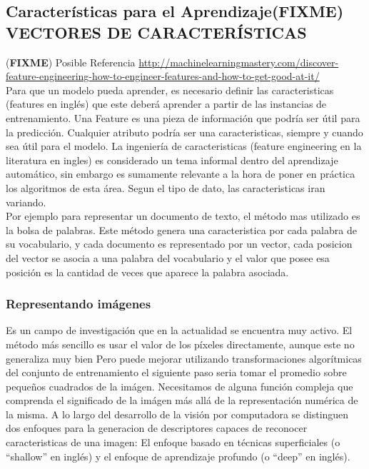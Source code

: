 \documentclass[a4paper,11pt,spanish]{book}
\newcommand*{\FIXME}[1]{{(\textbf{FIXME}) {#1}}}
\begin{document}
    \subsection{Características para el Aprendizaje\FIXME{VECTORES DE CARACTERÍSTICAS}}
      \FIXME{Posible Referencia \url{http://machinelearningmastery.com/discover-feature-engineering-how-to-engineer-features-and-how-to-get-good-at-it/}}\\
      Para que un modelo pueda aprender, es necesario definir las caracteristicas (features en inglés) que este deberá aprender a partir de las instancias de entrenamiento.
      Una Feature es una pieza de información que podría ser útil para la predicción. Cualquier atributo podría ser una caracteristicas, siempre y cuando sea útil para el modelo.
      La ingeniería de caracteristicas (feature engineering en la literatura en ingles) es considerado un tema informal dentro del aprendizaje automático, sin embargo es sumamente
      relevante a la hora de poner en práctica los algoritmos de esta área.
      Segun el tipo de dato, las caracteristicas iran variando. \\
      Por ejemplo para representar un documento de texto, el método mas utilizado es la bolsa de palabras.
      Este método genera una caracteristica por cada palabra de su vocabulario, y cada documento es representado por un vector, cada posicion del vector se asocia a una palabra del
      vocabulario y el valor que posee esa posición es la cantidad de veces que aparece la palabra asociada.

      \subsubsection{Representando imágenes}
	Es un campo de investigación que en la actualidad se encuentra muy activo. El método más sencillo es usar el valor de los píxeles directamente, aunque este no generaliza muy bien
	Pero puede mejorar utilizando transformaciones algorítmicas del conjunto de entrenamiento el siguiente paso seria tomar el promedio sobre pequeños cuadrados de la imágen.
	Necesitamos de alguna función compleja que comprenda el significado de la imágen más allá de la representación numérica de la misma.
	A lo largo del desarrollo de la visión por computadora se distinguen dos enfoques para la generacion de descriptores capaces de reconocer caracteristicas de una imagen:
	El enfoque basado en técnicas superficiales (o “shallow” en inglés) y el enfoque de aprendizaje profundo (o “deep” en inglés).
\end{document}

